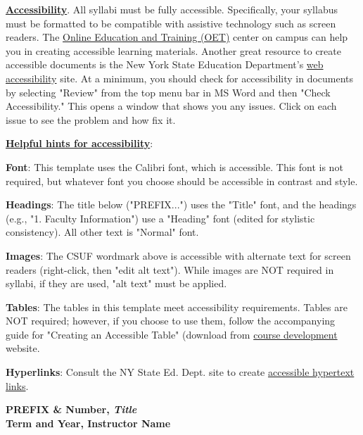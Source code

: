 \documentclass[12pt]{article}
\begin{document}
\textbf{\uline{Accessibility}}. All syllabi must be fully accessible. Specifically, your syllabus must be formatted to be compatible with assistive technology such as screen readers. The \href{https://oet.fullerton.edu/}{Online Education and Training (OET)} center on campus can help you in creating accessible learning materials. Another great resource to create accessible documents is the New York State Education Department's \href{http://www.nysed.gov/webaccess}{web accessibility} site. At a minimum, you should check for accessibility in documents by selecting "Review" from the top menu bar in MS Word and then "Check Accessibility." This opens a window that shows you any issues. Click on each issue to see the problem and how fix it.

\textbf{\uline{Helpful hints for accessibility}}:

\textbf{Font}: This template uses the Calibri font, which is accessible. This font is not required, but whatever font you choose should be accessible in contrast and style.

\textbf{Headings}: The title below ("PREFIX...") uses the "Title" font, and the headings (e.g., "1. Faculty Information") use a "Heading" font (edited for stylistic consistency). All other text is "Normal" font.

\textbf{Images}: The CSUF wordmark above is accessible with alternate text for screen readers (right-click, then "edit alt text"). While images are NOT required in syllabi, if they are used, "alt text" must be applied.

\textbf{Tables}: The tables in this template meet accessibility requirements. Tables are NOT required; however, if you choose to use them, follow the accompanying guide for "Creating an Accessible Table" (download from \href{http://www.fullerton.edu/academicprograms/curriculum/courses.php}{course development} website.

\textbf{Hyperlinks}: Consult the NY State Ed. Dept. site to create \href{http://www.nysed.gov/webaccess/create-accessible-hypertext-links}{accessible hypertext links}.

\vspace{2em}

\begin{center}
{\LARGE \textbf{PREFIX \& Number, \emph{Title}}}\\
\vspace{0.5em}
{\Large \textbf{Term and Year, Instructor Name}}
\end{center}
\end{document}
